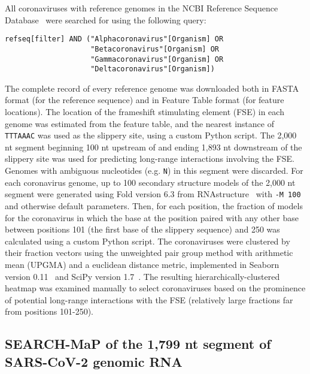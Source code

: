 \documentclass[main.tex]{subfiles}
\begin{document}
All coronaviruses with reference genomes in the NCBI Reference Sequence Database~\cite{OLeary2016} were searched for using the following query:
\begin{verbatim}
refseq[filter] AND ("Alphacoronavirus"[Organism] OR
                    "Betacoronavirus"[Organism] OR
                    "Gammacoronavirus"[Organism] OR
                    "Deltacoronavirus"[Organism])
\end{verbatim}
The complete record of every reference genome was downloaded both in FASTA format (for the reference sequence) and in Feature Table format (for feature locations).
The location of the frameshift stimulating element (FSE) in each genome was estimated from the feature table, and the nearest instance of \verb|TTTAAAC| was used as the slippery site, using a custom Python script.
The 2,000 nt segment beginning 100 nt upstream of and ending 1,893 nt downstream of the slippery site was used for predicting long-range interactions involving the FSE.
Genomes with ambiguous nucleotides (e.g. \verb|N|) in this segment were discarded.
For each coronavirus genome, up to 100 secondary structure models of the 2,000 nt segment were generated using Fold version 6.3 from RNAstructure~\cite{Mathews2004a} with \verb|-M 100| and otherwise default parameters.
Then, for each position, the fraction of models for the coronavirus in which the base at the position paired with any other base between positions 101 (the first base of the slippery sequence) and 250 was calculated using a custom Python script.
The coronaviruses were clustered by their fraction vectors using the unweighted pair group method with arithmetic mean (UPGMA) and a euclidean distance metric, implemented in Seaborn version 0.11~\cite{Waskom2021} and SciPy version 1.7~\cite{Virtanen2020}.
The resulting hierarchically-clustered heatmap was examined manually to select coronaviruses based on the prominence of potential long-range interactions with the FSE (relatively large fractions far from positions 101-250).


\subsection{SEARCH-MaP of the 1,799 nt segment of SARS-CoV-2 genomic RNA}
\end{document}
